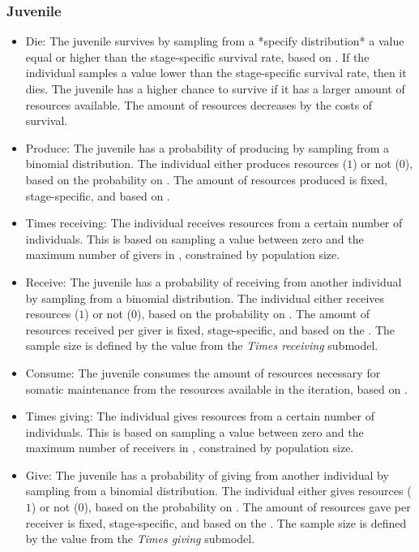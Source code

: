 \documentclass{article}
\begin{document}
\subsubsection{Juvenile}

\begin{itemize}
    \item Die: The juvenile survives by sampling from a *specify distribution* a value equal or higher than the stage-specific survival rate, based on \cite{gurven2007longevity}. If the individual samples a value lower than the stage-specific survival rate, then it dies. The juvenile has a higher chance to survive if it has a larger amount of resources available. The amount of resources decreases by the costs of survival.
    \item Produce: The juvenile has a probability of producing by sampling from a binomial distribution. The individual either produces resources ($1$) or not ($0$), based on the probability on \cite{koster2020life}. The amount of resources produced is fixed, stage-specific, and based on \cite{koster2020life}.
    \item Times receiving: The individual receives resources from a certain number of individuals. This is based on sampling a value between zero and the maximum number of givers in \cite{gurven2004give}, constrained by population size.
    \item Receive: The juvenile has a probability of receiving from another individual by sampling from a binomial distribution. The individual either receives resources ($1$) or not ($0$), based on the probability on \cite{gurven2004give}. The amount of resources received per giver is fixed, stage-specific, and based on the \cite{gurven2004give}. The sample size is defined by the value from the \emph{Times receiving} submodel. 
    \item Consume: The juvenile consumes the amount of resources necessary for somatic maintenance from the resources available in the iteration, based on \cite{kaplan2000theory}.
    \item Times giving: The individual gives resources from a certain number of individuals. This is based on sampling a value between zero and the maximum number of receivers in \cite{gurven2004give}, constrained by population size.
    \item Give: The juvenile has a probability of giving from another individual by sampling from a binomial distribution. The individual either gives resources ($1$) or not ($0$), based on the probability on \cite{gurven2004give}. The amount of resources gave per receiver is fixed, stage-specific, and based on the \cite{gurven2004give}. The sample size is defined by the value from the \emph{Times giving} submodel. 

\end{itemize}
\end{document}
